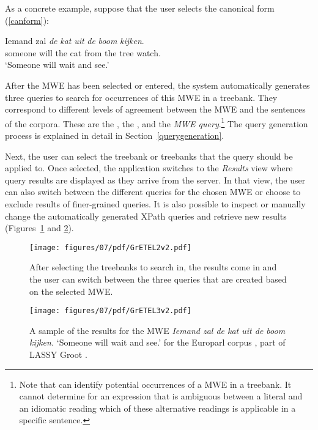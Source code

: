 \documentclass[output=paper,colorlinks,citecolor=brown]{langscibook}
\begin{document}
As a concrete example, suppose that the user selects the canonical form (\ref{canform}): 

\begin{exe}
\ex \gll Iemand zal \textit{de} \textit{kat} \textit{uit} \textit{de} \textit{boom} \textit{kijken}.\\
someone will the cat from the tree watch.\\
\glt `Someone will wait and see.' \label{canform}

\end{exe}


After the MWE has been selected or entered, the system automatically generates three queries to search for occurrences of this MWE in a treebank. They correspond to different levels of agreement between the MWE and the sentences of the corpora. These are the \textit{{\supersetquery}}, the \textit{\nearmissquery}, and the \textit{MWE query}.\footnote{Note that {\mwefinder} can identify potential occurrences of a MWE in a treebank. It cannot determine for an expression that is ambiguous between a literal and an idiomatic reading which of these alternative readings is applicable in a specific sentence.} The query generation process is explained in detail in Section~\ref{querygeneration}.




Next, the user can select the treebank or treebanks that the query should be applied to.
Once selected, the application switches to the \textit{Results} view where query results are displayed as they arrive from the server. In that view, the user can also switch between the different queries for the chosen MWE or choose to exclude results of finer-grained queries. It is also possible to inspect or manually change the automatically generated XPath queries and retrieve new results (Figures~\ref{fig:query-menu} and \ref{fig:results}).

\begin{figure}[p]
\caption{After selecting the treebanks to search in, the results come in and the user can switch between the three queries that are created based on the selected MWE.}
\label{fig:query-menu}
\texttt{[image: figures/07/pdf/GrETEL2v2.pdf]}
\end{figure}

\begin{figure}
\caption{A sample of the results for the MWE \textit{Iemand zal de kat uit de boom kijken.} `Someone will wait and see.' for the Europarl corpus \citep{koehn-2005-europarl}, part of LASSY Groot \citep{vanNoord:2008}.}
\label{fig:results}
\texttt{[image: figures/07/pdf/GrETEL3v2.pdf]}
\end{figure}
\end{document}
